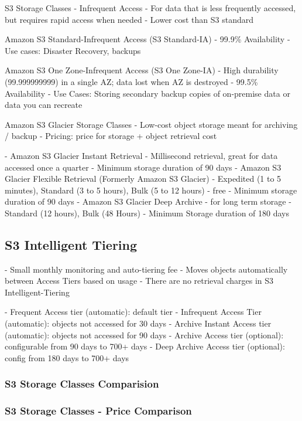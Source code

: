 \documentclass[11pt]{book}
\begin{document}
    S3 Storage Classes - Infrequent Access
    - For data that is less frequently accessed, but requires rapid access when needed
    - Lower cost than S3 standard

    Amazon S3 Standard-Infrequent Access (S3 Standard-IA)
    - 99.9\% Availability
    - Use cases: Disaster Recovery, backups

    Amazon S3 One Zone-Infrequent Access (S3 One Zone-IA)
    - High durability (99.999999999) in a single AZ; data lost when AZ is destroyed
    - 99.5\% Availability
    - Use Cases: Storing secondary backup copies of on-premise data or data you can recreate

    Amazon S3 Glacier Storage Classes
    - Low-cost object storage meant for archiving / backup
    - Pricing: price for storage + object retrieval cost

    - Amazon S3 Glacier Instant Retrieval
    - Millisecond retrieval, great for data accessed once a quarter
    - Minimum storage duration of 90 days
    - Amazon S3 Glacier Flexible Retrieval (Formerly Amazon S3 Glacier)
    - Expedited (1 to 5 minutes), Standard (3 to 5 hours), Bulk (5 to 12 hours) - free
    - Minimum storage duration of 90 days
    - Amazon S3 Glacier Deep Archive - for long term storage
    - Standard (12 hours), Bulk (48 Hours)
    - Minimum Storage duration of 180 days

    \subsection{S3 Intelligent Tiering}
    - Small monthly monitoring and auto-tiering fee
    - Moves objects automatically between Access Tiers based on usage
    - There are no retrieval charges in S3 Intelligent-Tiering

    - Frequent Access tier (automatic): default tier
    - Infrequent Access Tier (automatic): objects not accessed for 30 days
    - Archive Instant Access tier (automatic): objects not accessed for 90 days
    - Archive Access tier (optional): configurable from 90 days to 700+ days
    - Deep Archive Access tier (optional): config from 180 days to 700+ days

    \subsubsection{S3 Storage Classes Comparision}

    \subsubsection{S3 Storage Classes - Price Comparison}
\end{document}
